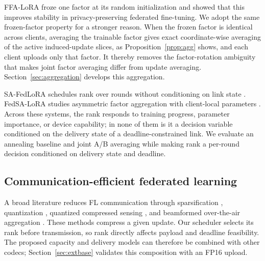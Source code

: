 \documentclass[a4paper,fleqn]{cas-dc}
\begin{document}
FFA-LoRA \cite{sun2024ffalora} froze one factor at its random initialization and showed that this improves stability in privacy-preserving federated fine-tuning. We adopt the same frozen-factor property for a stronger reason. When the frozen factor is identical across clients, averaging the trainable factor gives exact coordinate-wise averaging of the active induced-update slices, as Proposition~\ref{prop:agg} shows, and each client uploads only that factor. It thereby removes the factor-rotation ambiguity that makes joint factor averaging differ from update averaging. Section~\ref{sec:aggregation} develops this aggregation.

SA-FedLoRA schedules rank over rounds without conditioning on link state \cite{yang2024safedlora}. FedSA-LoRA studies asymmetric factor aggregation with client-local parameters \cite{guo2025fedsalora}. Across these systems, the rank responds to training progress, parameter importance, or device capability; in none of them is it a decision variable conditioned on the delivery state of a deadline-constrained link. We evaluate an annealing baseline and joint A/B averaging while making rank a per-round decision conditioned on delivery state and deadline.

\subsection{Communication-efficient federated learning}
A broad literature reduces FL communication through sparsification \cite{lin2018deep}, quantization \cite{liu2023adaptivequant,reisizadeh2020fedpaq}, quantized compressed sensing \cite{oh2023fedqcs,oh2024fedvqcs}, and beamformed over-the-air aggregation \cite{kim2023beamforming}. These methods compress a given update. Our scheduler selects its rank before transmission, so rank directly affects payload and deadline feasibility. The proposed capacity and delivery models can therefore be combined with other codecs; Section~\ref{sec:extbase} validates this composition with an FP16 upload.
\end{document}
